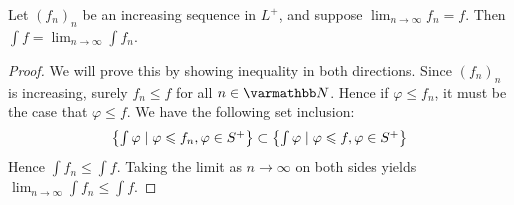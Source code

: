 \begin{theorem}\label{thm:mct}
    Let $(f_n)_n$ be an increasing sequence in $L^+$, and suppose $\lim_{n \rightarrow \infty}f_n = f$. Then $\int f = \lim_{n \rightarrow \infty} \int f_n$.
\end{theorem}
    \begin{proof}
        We will prove this by showing inequality in both directions. Since $(f_n)_n$ is increasing, surely $f_n \leq f$ for all $n \in \bfN$. Hence if $\varphi \leq f_n$, it must be the case that $\varphi \leq f$. We have the following set inclusion:
            \begin{equation*}
            \begin{split}
                \left\{ \textstyle \int \varphi \mid \varphi \leqslant f_n, \varphi \in S^+\right\} \subset \left\{ \textstyle \int \varphi \mid \varphi \leqslant f, \varphi \in S^+\right\}
            \end{split}
            \end{equation*}
        Hence $\int f_n \leq \int f$. Taking the limit as $n \rightarrow \infty$ on both sides yields $\lim_{n \rightarrow \infty} \int f_n \leq \int f$.


\end{proof}
